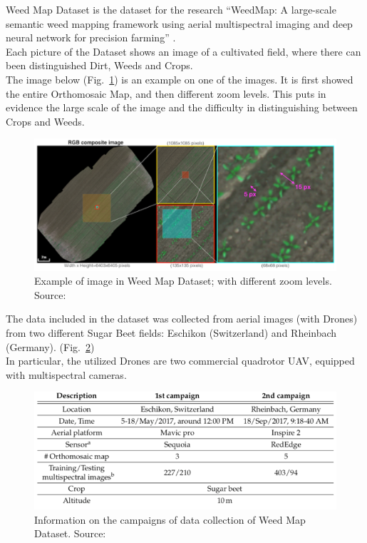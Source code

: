 Weed Map Dataset is the dataset for the research “WeedMap: A large-scale semantic weed mapping framework using aerial multispectral imaging and deep neural network for precision farming” \cite{Tesi-2.1}.
\\[0.3cm]Each picture of the Dataset shows an image of a cultivated field, where there can been distinguished Dirt, Weeds and Crops.
\\[0.3cm]The image below (Fig.~\ref{fig:figure-4.5.1}) is an example on one of the images. It is first showed the entire Orthomosaic Map, and then different zoom levels. This puts in evidence the large scale of the image and the difficulty in distinguishing between Crops and Weeds.
\begin{figure}[t]
	\centering
	\includegraphics[width=14cm]{figures/figure-4.5.1.png}
	\caption[Example of image in Weed Map Dataset]{Example of image in Weed Map Dataset; with different zoom levels. Source:~\cite{Tesi-2.1}}
	\label{fig:figure-4.5.1}
\end{figure}

The data included in the dataset was collected from aerial images (with Drones) from two different Sugar Beet fields: Eschikon (Switzerland) and Rheinbach (Germany). (Fig.~\ref{fig:figure-4.5.2})
\\[0.3cm]In particular, the utilized Drones are two commercial quadrotor UAV, equipped with multispectral cameras.
\begin{figure}[t]
	\centering
	\includegraphics[width=13cm]{figures/figure-4.5.2.png}
	\caption[Information on Campaigns of Weed Map Dataset]{Information on the campaigns of data collection of Weed Map Dataset. Source:~\cite{Tesi-2.1}}
	\label{fig:figure-4.5.2}
\end{figure}

